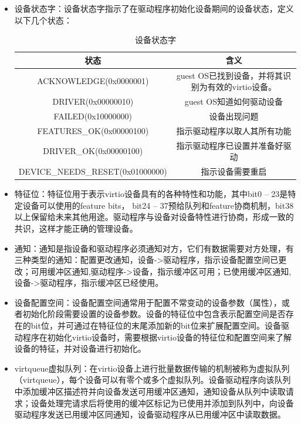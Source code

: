 \begin{itemize}
	\item 设备状态字：设备状态字指示了在驱动程序初始化设备期间的设备状态，定义以下几个状态：

\begin{table}[h]
	\centering
	\begin{tabular}{|c|c|}    
		\hline
		状态&含义\\
		\hline
		ACKNOWLEDGE(0x0000001) & guest OS已找到设备，并将其识别为有效的virtio设备。	\\
		\hline
		DRIVER(0x00000010) & guest OS知道如何驱动设备 \\
		\hline
		FAILED(0x10000000) & 设备出现问题 \\
		\hline
		FEATURES\_OK(0x00000100) & 指示驱动程序以取人其所有功能 \\
		\hline
		DRIVER\_OK(0x00000100) & 指示驱动程序已设置并准备好驱动 \\
		\hline
		DEVICE\_NEEDS\_RESET(0x01000000) & 指示设备需要重启 \\
		\hline
	\end{tabular}
	\caption{设备状态字}
\end{table}


	\item 特征位：特征位用于表示virtio设备具有的各种特性和功能，其中bit0 – 23是特定设备可以使用的feature bits， bit24 – 37预给队列和feature协商机制，bit38以上保留给未来其他用途。驱动程序与设备对设备特性进行协商，形成一致的共识，这样才能正确的管理设备。

	\item 通知：通知是指设备和驱动程序必须通知对方，它们有数据需要对方处理，有三种类型的通知：配置更改通知，设备->驱动程序，指示设备配置空间已更改；可用缓冲区通知,驱动程序->设备，指示缓冲区可用；已使用缓冲区通知,设备->驱动程序，指示缓冲区已经使用。

	\item 设备配置空间：设备配置空间通常用于配置不常变动的设备参数（属性），或者初始化阶段需要设置的设备参数。设备的特征位中包含表示配置空间是否存在的bit位，并可通过在特征位的末尾添加新的bit位来扩展配置空间。设备驱动程序在初始化virtio设备时，需要根据virtio设备的特征位和配置空间来了解设备的特征，并对设备进行初始化。

	\item virtqueue虚拟队列：在virtio设备上进行批量数据传输的机制被称为虚拟队列（virtqueue），每个设备可以有零个或多个虚拟队列。设备驱动程序向该队列中添加缓冲区描述符并向设备发送可用缓冲区通知，通知设备从队列中读取请求；设备处理完请求后将使用的缓冲区标记为已使用并添加到队列中，向设备驱动程序发送已用缓冲区同通知，设备驱动程序从已用缓冲区中读取数据。
\end{itemize}

